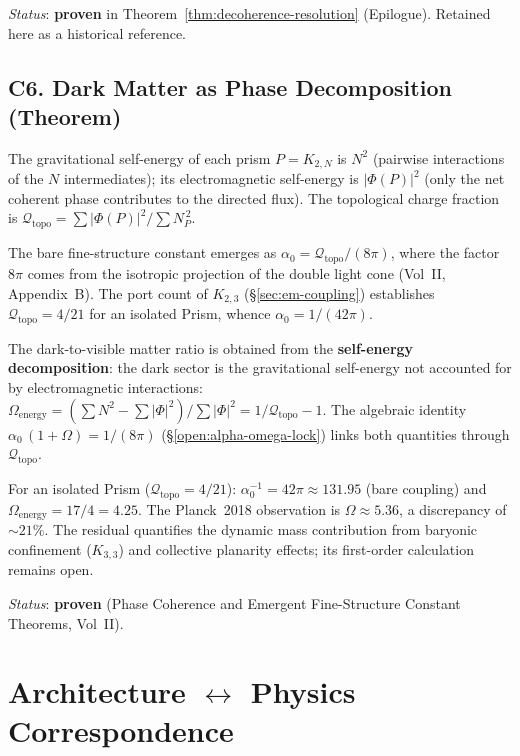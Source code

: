 \medskip\noindent
\textit{Status}: \textbf{proven} in Theorem~\ref{thm:decoherence-resolution} (Epilogue).
Retained here as a historical reference.

\subsection*{C6. Dark Matter as Phase Decomposition (Theorem)}
\label{conj:dark-matter}

The gravitational self-energy of each prism $P = K_{2,N}$ is
$N^2$ (pairwise interactions of the $N$ intermediates); its
electromagnetic self-energy is $|\Phi(P)|^2$ (only the net
coherent phase contributes to the directed flux). The
topological charge fraction is
$\mathcal{Q}_{\mathrm{topo}} = \sum|\Phi(P)|^2 / \sum N_P^{\,2}$.

The bare fine-structure constant emerges as
$\alpha_0 = \mathcal{Q}_{\mathrm{topo}} / (8\pi)$, where the factor
$8\pi$ comes from the isotropic projection of the double light cone
(Vol~II, Appendix~B). The port count of $K_{2,3}$
(\S\ref{sec:em-coupling}) establishes
$\mathcal{Q}_{\mathrm{topo}} = 4/21$ for an isolated Prism, whence
$\alpha_0 = 1/(42\pi)$.

The dark-to-visible matter ratio is obtained from the
\textbf{self-energy decomposition}: the dark sector is the
gravitational self-energy not accounted for by electromagnetic
interactions:
$\Omega_{\mathrm{energy}} = (\sum N^2 - \sum|\Phi|^2) / \sum|\Phi|^2
= 1/\mathcal{Q}_{\mathrm{topo}} - 1$.
The algebraic identity $\alpha_0\,(1 + \Omega) = 1/(8\pi)$
(\S\ref{open:alpha-omega-lock}) links both quantities through
$\mathcal{Q}_{\mathrm{topo}}$.

For an isolated Prism ($\mathcal{Q}_{\mathrm{topo}} = 4/21$):
$\alpha_0^{-1} = 42\pi \approx 131{.}95$ (bare coupling) and
$\Omega_{\mathrm{energy}} = 17/4 = 4{.}25$. The Planck~2018
observation is $\Omega \approx 5{.}36$, a discrepancy of
${\sim}\!21\%$. The residual quantifies the dynamic mass
contribution from baryonic confinement ($K_{3,3}$) and collective
planarity effects; its first-order calculation remains
open.

\medskip\noindent
\textit{Status}: \textbf{proven} (Phase Coherence
and Emergent Fine-Structure Constant Theorems, Vol~II).

\section{Architecture $\leftrightarrow$ Physics Correspondence}

